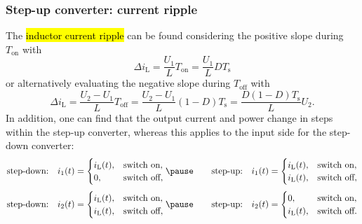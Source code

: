 \begin{frame}
	\frametitle{Step-up converter: current ripple}
	The \hl{inductor current ripple} can be found considering the positive slope during $T_\mathrm{on}$ with
	\begin{equation}
		\Delta i_\mathrm{L} = \frac{U_1}{L}T_\mathrm{on} = \frac{U_1}{L}DT_\mathrm{s}
		\label{eq:current-ripple-simple-step-up-pos}
	\end{equation}\pause
	or alternatively evaluating the negative slope during $T_\mathrm{off}$ with
	\begin{equation}
		\Delta i_\mathrm{L} = \frac{U_2-U_1}{L}T_\mathrm{off} = \frac{U_2-U_1}{L}(1-D)T_\mathrm{s}=\frac{D(1-D)T_\mathrm{s}}{L}U_2.
		\label{eq:current-ripple-simple-step-up-neg}
	\end{equation}\pause
	In addition, one can find that the output current and power change in steps within the step-up converter, whereas this applies to the input side for the step-down converter:
	\begin{equation*}
		\mbox{step-down:} \quad i_1(t) = \begin{cases}
			i_\mathrm{L}(t), & \mbox{switch on},  \\
			0,               & \mbox{switch off},
		\end{cases}\pause
		\qquad
		\mbox{step-up:} \quad i_1(t) = \begin{cases}
			i_\mathrm{L}(t), & \mbox{switch on},  \\
			i_\mathrm{L}(t), & \mbox{switch off},
		\end{cases}
	\end{equation*}\pause
	\begin{equation*}
		\mbox{step-down:} \quad i_2(t) = \begin{cases}
			i_\mathrm{L}(t), & \mbox{switch on},  \\
			i_\mathrm{L}(t), & \mbox{switch off},
		\end{cases}\pause
		\qquad
		\mbox{step-up:} \quad i_2(t) = \begin{cases}
			0,               & \mbox{switch on},  \\
			i_\mathrm{L}(t), & \mbox{switch off}.
		\end{cases}
	\end{equation*}
\end{frame}

